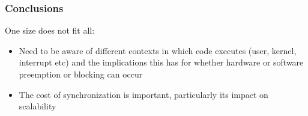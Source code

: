 \begin{frame}[fragile]
    \frametitle{Conclusions}
    \Large    
   One size does not fit all:
   
    \begin{itemize}
        \item  Need to be aware of different contexts in which code
        executes (user, kernel, interrupt etc) and the implications
        this has for whether hardware or software preemption or
        blocking can occur
        \item The cost of synchronization is important, particularly its
        impact on scalability
    \end{itemize}  
\end{frame}
